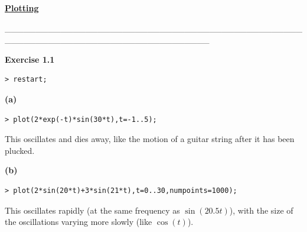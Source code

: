 \documentclass{article}
\begin{document}
\lstset{basicstyle=\ttfamily,breaklines=true,columns=flexible}
\pagestyle{empty}
\begin{center}
\begin{Maple Title}
\underline{\textbf{Plotting}}
\end{Maple Title}
\end{center}
\begin{Maple Normal}
\_\_\_\_\_\_\_\_\_\_\_\_\_\_\_\_\_\_\_\_\_\_\_\_\_\_\_\_\_\_\_\_\_\_\_\_\_\_\_\_\_\_\_\_\_\_\_\_\_\_\_\_\_\_\_\_\_\_\_\_\_\_\_\_\_\_\_\_\_\_\_\_\_\_\_\_\_\_\_\_\_
\end{Maple Normal}
\begin{Maple Heading 2}
\textbf{Exercise 1.1}
\end{Maple Heading 2}
\begin{lstlisting}
> restart;
\end{lstlisting}
\begin{Maple Normal}
\textbf{(a)}
\end{Maple Normal}
\begin{lstlisting}
> plot(2*exp(-t)*sin(30*t),t=-1..5);
\end{lstlisting}
\begin{Maple Normal}
This oscillates and dies away, like the motion of a guitar string after it has been plucked.
\end{Maple Normal}
\begin{Maple Normal}
\textbf{(b)}
\end{Maple Normal}
\begin{lstlisting}
> plot(2*sin(20*t)+3*sin(21*t),t=0..30,numpoints=1000);
\end{lstlisting}
\begin{Maple Normal}
This oscillates rapidly (at the same frequency as 
$\sin ( 20.5 t)$), with the size of the oscillations varying more slowly  (like 
$\cos (t)$).
\end{Maple Normal}
\end{document}
